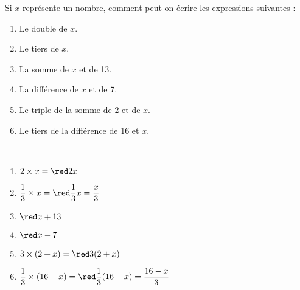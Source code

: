 \begin{exercice}
    Si $x$ représente un nombre, comment peut-on écrire les expressions suivantes :
    \begin{enumerate}
       \item Le double de $x$.
       \item Le tiers de $x$.
       \item La somme de $x$ et de 13.
       \item La différence de $x$ et de 7.
       \item Le triple de la somme de 2 et de $x$.
       \item Le tiers de la différence de 16 et $x$.
    \end{enumerate}
 \end{exercice}
 
 \begin{corrige}
    \ \\ [-5mm]
    \begin{enumerate}
       \item $2\times x =\red2x$ \smallskip
       \item $\dfrac13\times x =\red\dfrac13x =\dfrac{x}{3}$ \smallskip
       \item $\red x+13$
       \item $\red x-7$
       \item $3\times(2+x) =\red3(2+x)$ \smallskip
       \item $\dfrac13\times(16-x) =\red\dfrac13(16-x) =\dfrac{16-x}{3}$
    \end{enumerate}
 \end{corrige}

